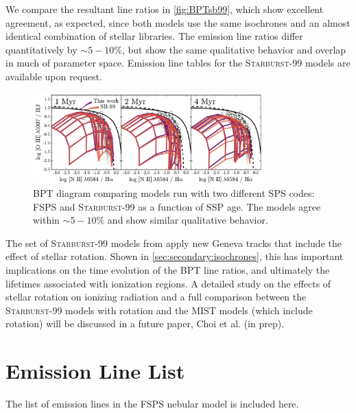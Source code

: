 \documentclass[twocolumn, tighten]{aastex61}
\newcommand{\Fig}[1]{\autoref{fig:#1}}
\newcommand{\Sec}[1]{\autoref{sec:#1}}
\newcommand{\FSPS}{{\sc FSPS}\xspace}
\newcommand{\SB}{\textsc{Starburst-99}\xspace}
\begin{document}
We compare the resultant line ratios in \Fig{BPTsb99}, which show excellent agreement, as expected, since both models use the same isochrones and an almost identical combination of stellar libraries. The emission line ratios differ quantitatively by $\sim5-10\%$, but show the same qualitative behavior and overlap in much of parameter space. Emission line tables for the \SB models are available upon request.

\begin{figure} [ht!]
  \begin{centering}
    \includegraphics[width=0.8\textwidth]{f30.pdf}
    \caption{BPT diagram comparing models run with two different SPS codes: FSPS and \SB as a function of SSP age. The models agree within $\sim5-10\%$ and show similar qualitative behavior.}
    \label{fig:BPTsb99}
  \end{centering}
\end{figure}

The set of \SB models from \citet{Levesque14} apply new Geneva tracks that include the effect of stellar rotation. Shown in \Sec{secondary:isochrones}, this has important implications on the time evolution of the BPT line ratios, and ultimately the lifetimes associated with ionization regions. A detailed study on the effects of stellar rotation on ionizing radiation and a full comparison between the \SB models with rotation and the MIST models (which include rotation) will be discussed in a future paper, Choi et al. (in prep).

\section{Emission Line List}\label{sec:appendix}
The list of emission lines in the \FSPS nebular model is included here.
\end{document}
